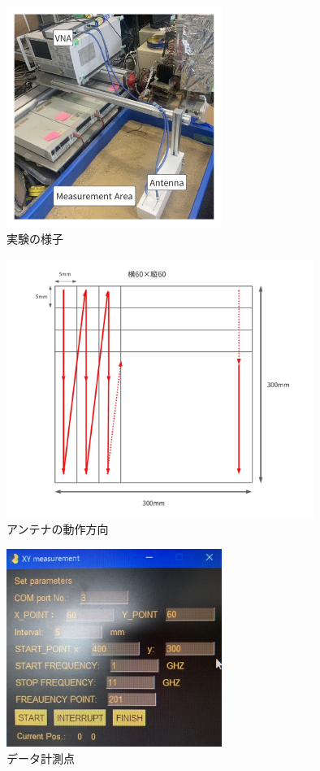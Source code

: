 \documentclass[a4paper,12pt]{jsreport}
\begin{document}
\begin{figure}[h]
  \begin{center}
   \includegraphics[width=7cm]{./image/Exp_Situ.pdf}
  \caption{実験の様子}\label{実験の様子}
  \end{center}
  \end{figure}

  \begin{figure}[h]
    \begin{center}
     \includegraphics[width=10cm]{./image/sweep.pdf}
    \caption{アンテナの動作方向}\label{アンテナの動作方向}
    \end{center}
    \end{figure}


  \begin{figure}[h]
    \begin{center}
     \includegraphics[width=7cm]{./dataimage/exp_image/gui.jpg}
    \caption{データ計測点}\label{データ計測点}
    \end{center}
    \end{figure}
\end{document}
